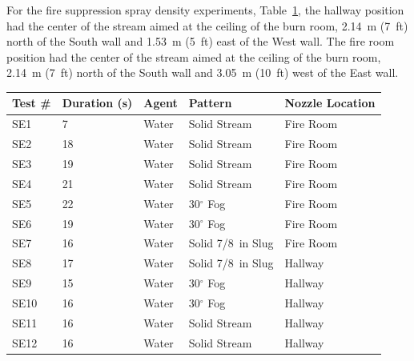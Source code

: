 \documentclass[12pt,oneside]{book}
\begin{document}
For the fire suppression spray density experiments, Table~\ref{tab:spray_density_tests2}, the hallway position had the center of the stream aimed at the ceiling of the burn room, 2.14~m (7~ft) north of the South wall and 1.53~m (5~ft) east of the West wall. The fire room position had the center of the stream aimed at the ceiling of the burn room, 2.14~m (7~ft) north of the South wall and 3.05~m (10~ft) west of the East wall.

\begin{table}[!ht]
\footnotesize
\centering
{}\label{tab:spray_density_tests2}
\begin{tabular}{lllll}
\toprule[1.5pt]
Test \#    & Duration (s)  & Agent  &  Pattern            & Nozzle Location  \\
\midrule
SE1        & 7             & Water  &  Solid Stream       &    Fire Room          \\
SE2        & 18            & Water  &  Solid Stream       &    Fire Room          \\
SE3        & 19            & Water  &  Solid Stream       &    Fire Room          \\
SE4        & 21            & Water  &  Solid Stream       &    Fire Room          \\
SE5        & 22            & Water  &  30$^{\circ}$ Fog   &    Fire Room          \\
SE6        & 19            & Water  &  30$^{\circ}$ Fog   &    Fire Room          \\
SE7        & 16            & Water  &  Solid 7/8~in Slug  &    Fire Room          \\
SE8        & 17            & Water  &  Solid 7/8~in Slug  &    Hallway            \\
SE9        & 15            & Water  &  30$^{\circ}$ Fog   &    Hallway            \\
SE10       & 16            & Water  &  30$^{\circ}$ Fog   &    Hallway            \\
SE11       & 16            & Water  &  Solid Stream       &    Hallway            \\
SE12       & 16            & Water  &  Solid Stream       &    Hallway            \\
\bottomrule[1.25pt]
\end{tabular}\par
\end{table}

\clearpage
\end{document}
